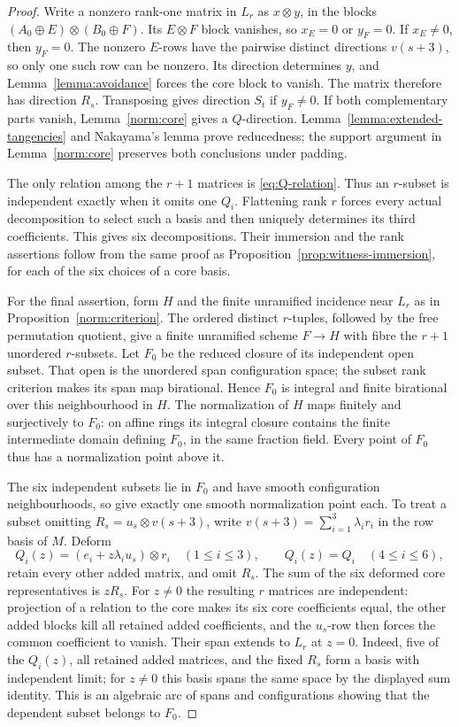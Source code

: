 \begin{proof}
Write a nonzero rank-one matrix in $L_r$ as $x\otimes y$, in
the blocks $(A_0\oplus E)\otimes(B_0\oplus F)$.
Its $E\otimes F$ block vanishes, so $x_E=0$ or $y_F=0$.
If $x_E\ne0$, then $y_F=0$. The nonzero $E$-rows have the
pairwise distinct directions $v(s+3)$, so only one such row
can be nonzero. Its direction determines $y$, and
Lemma~\ref{lemma:avoidance} forces the core block to vanish.
The matrix therefore has direction $R_s$. Transposing gives
direction $S_t$ if $y_F\ne0$. If both complementary parts
vanish, Lemma~\ref{norm:core} gives a $Q$-direction.
Lemma~\ref{lemma:extended-tangencies} and Nakayama's lemma prove
reducedness; the support argument in Lemma~\ref{norm:core}
preserves both conclusions under padding.

The only relation among the $r+1$ matrices is
\eqref{eq:Q-relation}. Thus an $r$-subset is independent exactly
when it omits one $Q_i$. Flattening rank $r$ forces every actual
decomposition to select such a basis and then uniquely determines
its third coefficients. This gives six decompositions.
Their immersion and the rank assertions follow from the same
proof as Proposition~\ref{prop:witness-immersion}, for each of
the six choices of a core basis.

For the final assertion, form $H$ and the finite unramified
incidence near $L_r$ as in Proposition~\ref{norm:criterion}.
The ordered distinct $r$-tuples, followed by the free permutation
quotient, give a finite unramified scheme $F\to H$ with fibre
the $r+1$ unordered $r$-subsets. Let $F_0$ be the reduced
closure of its independent open subset. That open is the
unordered span configuration space; the subset rank criterion
makes its span map birational. Hence $F_0$ is integral and
finite birational over this neighbourhood in $H$.
The normalization of $H$ maps finitely and surjectively to
$F_0$: on affine rings its integral closure contains the finite
intermediate domain defining $F_0$, in the same fraction field.
Every point of $F_0$ thus has a normalization point above it.

The six independent subsets lie in $F_0$ and have smooth
configuration neighbourhoods, so give exactly one smooth
normalization point each. To treat a subset omitting
$R_s=u_s\otimes v(s+3)$, write
$v(s+3)=\sum_{i=1}^3\lambda_i r_i$ in the row basis of $M$.
Deform
\[
 Q_i(z)=(e_i+z\lambda_i u_s)\otimes r_i\quad(1\leq i\leq3),
 \qquad Q_i(z)=Q_i\quad(4\leq i\leq6),
\]
retain every other added matrix, and omit $R_s$. The sum of the
six deformed core representatives is $zR_s$. For $z\ne0$ the
resulting $r$ matrices are independent: projection of a relation
to the core makes its six core coefficients equal, the other
added blocks kill all retained added coefficients, and the
$u_s$-row then forces the common coefficient to vanish.
Their span extends to $L_r$ at $z=0$. Indeed, five of the
$Q_i(z)$, all retained added matrices, and the fixed $R_s$
form a basis with independent limit; for $z\ne0$ this basis
spans the same space by the displayed sum identity.
This is an algebraic arc of spans and configurations showing
that the dependent subset belongs to $F_0$.


\end{proof}
